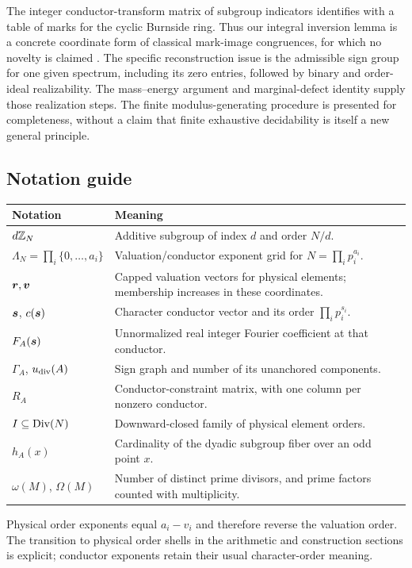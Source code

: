 The integer conductor-transform matrix of subgroup indicators identifies with a table of marks for the cyclic Burnside ring. Thus our integral inversion lemma is a concrete coordinate form of classical mark-image congruences, for which no novelty is claimed \cite{tomDieck1979,BoltjePfeiffer2008}. The specific reconstruction issue is the admissible sign group for one given spectrum, including its zero entries, followed by binary and order-ideal realizability. The mass--energy argument and marginal-defect identity supply those realization steps. The finite modulus-generating procedure is presented for completeness, without a claim that finite exhaustive decidability is itself a new general principle.

\subsection{Notation guide}
\begin{center}\small
\begin{tabular}{@{}p{.22\linewidth}p{.71\linewidth}@{}}\toprule
Notation & Meaning\\\midrule
$d\mathbb Z_N$ & Additive subgroup of index $d$ and order $N/d$.\\
$\Lambda_N=\prod_i\{0,\ldots,a_i\}$ & Valuation/conductor exponent grid for $N=\prod_i p_i^{a_i}$.\\
$\boldsymbol{r},\boldsymbol{v}$ & Capped valuation vectors for physical elements; membership increases in these coordinates.\\
$\boldsymbol{s}$, $c(\boldsymbol{s})$ & Character conductor vector and its order $\prod_i p_i^{s_i}$.\\
$F_A(\boldsymbol{s})$ & Unnormalized real integer Fourier coefficient at that conductor.\\
$\Gamma_A$, $u_{\rm div}(A)$ & Sign graph and number of its unanchored components.\\
$R_A$ & Conductor-constraint matrix, with one column per nonzero conductor.\\
$I\subseteq\operatorname{Div}(N)$ & Downward-closed family of physical element orders.\\
$h_A(x)$ & Cardinality of the dyadic subgroup fiber over an odd point $x$.\\
$\omega(M)$, $\Omega(M)$ & Number of distinct prime divisors, and prime factors counted with multiplicity.\\\bottomrule
\end{tabular}
\end{center}
Physical order exponents equal $a_i-v_i$ and therefore reverse the valuation order. The transition to physical order shells in the arithmetic and construction sections is explicit; conductor exponents retain their usual character-order meaning.

